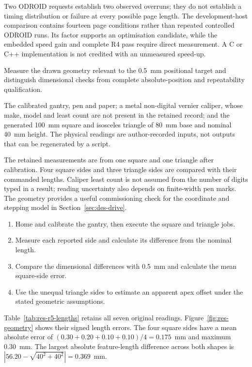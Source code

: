 Two ODROID requests establish two observed overruns; they do not establish a timing distribution or failure at every possible page length. The development-host comparison contains fourteen page conditions rather than repeated controlled ODROID runs. Its factor supports an optimisation candidate, while the embedded speed gain and complete R4 pass require direct measurement. A C or C++ implementation is not credited with an unmeasured speed-up.

Measure the drawn geometry relevant to the 0.5~mm positional target and distinguish dimensional checks from complete absolute-position and repeatability qualification.

The calibrated gantry, pen and paper; a metal non-digital vernier caliper, whose make, model and least count are not present in the retained record; and the generated 100~mm square and isosceles triangle of 80~mm base and nominal 40~mm height. The physical readings are author-recorded inputs, not outputs that can be regenerated by a script.

The retained measurements are from one square and one triangle after calibration. Four square sides and three triangle sides are compared with their commanded lengths. Caliper least count is not assumed from the number of digits typed in a result; reading uncertainty also depends on finite-width pen marks. The geometry provides a useful commissioning check for the coordinate and stepping model in Section~\ref{sec:des-drive}.

\begin{enumerate}\setlength{\itemsep}{1pt}
\item Home and calibrate the gantry, then execute the square and triangle jobs.
\item Measure each reported side and calculate its difference from the nominal length.
\item Compare the dimensional differences with 0.5~mm and calculate the mean square-side error.
\item Use the unequal triangle sides to estimate an apparent apex offset under the stated geometric assumptions.
\end{enumerate}

Table~\ref{tab:res-r5-lengths} retains all seven original readings. Figure~\ref{fig:res-geometry} shows their signed length errors. The four square sides have a mean absolute error of $(0.30+0.20+0.10+0.10)/4=0.175$~mm and maximum 0.30~mm. The largest absolute feature-length difference across both shapes is $|56.20-\sqrt{40^2+40^2}|=0.369$~mm.


